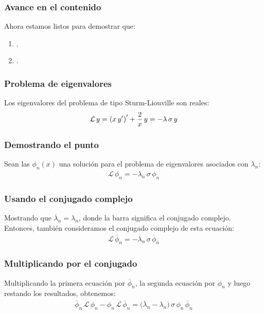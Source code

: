 \documentclass[12pt]{beamer}
\begin{document}
\begin{frame}
\frametitle{Avance en el contenido}
Ahora estamos listos para demostrar que:
\begin{enumerate}[<+->]
\item {}.
\item {}.
\end{enumerate}
\end{frame}
\begin{frame}
\frametitle{Problema de eigenvalores}
Los eigenvalores del problema de tipo Sturm-Liouville son reales:
\pause
\begin{align*}
\mathcal{L} \, y = \left( x \, {y}^{\prime} \right)^{\prime} + \dfrac{2}{x} \, y = - \lambda \, \sigma \, y
\end{align*}
\end{frame}
\begin{frame}
\frametitle{Demostrando el punto}
Sean las $\phi_{n}(x)$ una solución para el problema de eigenvalores asociados con $\lambda_{n}$:
\pause
\begin{align*}
\mathcal{L} \, \phi_{n} = - \lambda_{n} \, \sigma \, \phi_{n}
\end{align*}
\end{frame}
\begin{frame}
\frametitle{Usando el conjugado complejo}
Mostrando que $\overline{\lambda}_{n} = \lambda_{n}$, donde la barra significa el conjugado complejo.
\\
\bigskip
\pause
Entonces, también consideramos el conjugado complejo de esta ecuación:
\begin{align*}
\mathcal{L} \, \overline{\phi}_{n} = - \overline{\lambda}_{n} \, \sigma \, \overline{\phi}_{n}
\end{align*}
\end{frame}
\begin{frame}
\frametitle{Multiplicando por el conjugado}
Multiplicando la primera ecuación por $\overline{\phi}_{n}$, la segunda ecuación por $\phi_{n}$ y luego restando los resultados, obtenemos:
\pause
\begin{align*}
\overline{\phi}_{n} \, \mathcal{L} \, \phi_{n} - \phi_{n} \, \mathcal{L} \, \overline{\phi}_{n} = \big( \overline{\lambda}_{n} - \lambda_{n} \big) \, \sigma \, \phi_{n} \, \overline{\phi}_{n}
\end{align*}
\end{frame}
\end{document}
